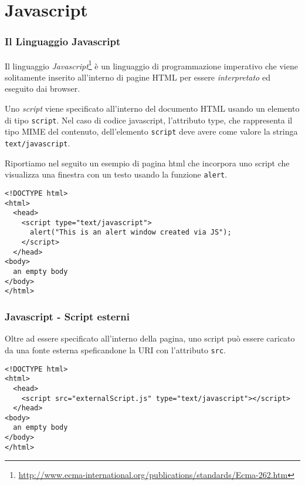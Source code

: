 \documentclass[8pt]{beamer}
\begin{document}
\section{Javascript}

\begin{frame}[fragile]
 \frametitle{Il Linguaggio Javascript}
 Il linguaggio \emph{Javascript}\footnote{\url{http://www.ecma-international.org/publications/standards/Ecma-262.htm}}
 \`e un linguaggio di programmazione imperativo che viene solitamente inserito
 all'interno di pagine HTML per essere \emph{interpretato} ed eseguito dai browser.
 \vspace{\baselineskip} 
 
 Uno \emph{script} viene specificato all'interno 
 del documento HTML usando un elemento di tipo \texttt{script}.
 Nel caso di codice javascript, l'attributo type,
 che rappresenta il tipo MIME del contenuto,
 dell'elemento \texttt{script} deve avere come valore la 
 stringa \texttt{text/javascript}. 
 \vspace{\baselineskip} 
 
 Riportiamo nel seguito un esempio di pagina html
 che incorpora uno script che visualizza una finestra
 con un testo usando la funzione \texttt{alert}.
 \begin{small}
 \begin{verbatim}
<!DOCTYPE html>
<html>
  <head>
    <script type="text/javascript">
      alert("This is an alert window created via JS");
    </script>
  </head>
<body>
  an empty body
</body>
</html>  
 \end{verbatim}
 \end{small}
\end{frame}

\begin{frame}[fragile]
 \frametitle{Javascript - Script esterni}
 Oltre ad essere specificato all'interno della pagina, uno script
 pu\`o essere caricato da una fonte esterna speficandone la URI
 con l'attributo \texttt{src}.
 \begin{small}
 \begin{verbatim}
<!DOCTYPE html>
<html>
  <head>
    <script src="externalScript.js" type="text/javascript"></script>
  </head>
<body>
  an empty body
</body>
</html>  
 \end{verbatim}
 \end{small}
 
\end{frame}
\end{document}
